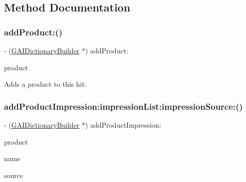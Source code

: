 \subsection{Method Documentation}
\mbox{\label{interface_g_a_i_dictionary_builder_ae87ab67f665b29378b76be8d0c817379}} 
\subsubsection{\texorpdfstring{add\+Product\+:()}{addProduct:()}}
{\footnotesize\ttfamily -\/ (\hyperlink{interface_g_a_i_dictionary_builder}{G\+A\+I\+Dictionary\+Builder} $\ast$) add\+Product\+: \begin{DoxyParamCaption}\item[{(\hyperlink{interface_g_a_i_ecommerce_product}{G\+A\+I\+Ecommerce\+Product} $\ast$)}]{product }\end{DoxyParamCaption}}

Adds a product to this hit. \mbox{\label{interface_g_a_i_dictionary_builder_a97327f7a0253452b9229d0d8605516e4}} 
\subsubsection{\texorpdfstring{add\+Product\+Impression\+:impression\+List\+:impression\+Source\+:()}{addProductImpression:impressionList:impressionSource:()}}
{\footnotesize\ttfamily -\/ (\hyperlink{interface_g_a_i_dictionary_builder}{G\+A\+I\+Dictionary\+Builder} $\ast$) add\+Product\+Impression\+: \begin{DoxyParamCaption}\item[{(\hyperlink{interface_g_a_i_ecommerce_product}{G\+A\+I\+Ecommerce\+Product} $\ast$)}]{product }\item[{impressionList:(N\+S\+String $\ast$)}]{name }\item[{impressionSource:(N\+S\+String $\ast$)}]{source }\end{DoxyParamCaption}}

